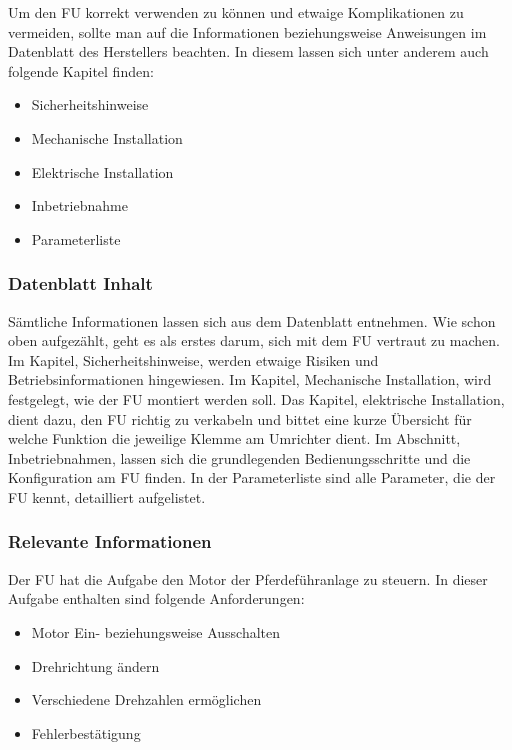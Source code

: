 Um den \ac{FU} korrekt verwenden zu können und etwaige Komplikationen zu vermeiden, sollte man auf die Informationen beziehungsweise Anweisungen im Datenblatt des Herstellers beachten. In diesem lassen sich unter anderem auch folgende Kapitel finden:

\begin{itemize}
	\item{Sicherheitshinweise}
	\item{Mechanische Installation}
	\item{Elektrische Installation}
	\item{Inbetriebnahme}
	\item{Parameterliste}
\end{itemize}

\subsubsection{Datenblatt Inhalt}
\label{sec:datenblattinhalt}

Sämtliche Informationen lassen sich aus dem Datenblatt entnehmen. Wie schon oben aufgezählt, geht es als erstes darum, sich mit dem \ac{FU} vertraut zu machen. Im  Kapitel, Sicherheitshinweise, werden etwaige Risiken und Betriebsinformationen hingewiesen. Im Kapitel, Mechanische Installation, wird festgelegt, wie der \ac{FU} montiert werden soll. Das Kapitel, elektrische Installation, dient dazu, den \ac{FU} richtig zu verkabeln und bittet eine kurze Übersicht für welche Funktion die jeweilige Klemme am Umrichter dient. Im Abschnitt, Inbetriebnahmen, lassen sich die grundlegenden Bedienungsschritte und die Konfiguration am \ac{FU} finden. In der Parameterliste sind alle Parameter, die der \ac{FU} kennt, detailliert aufgelistet.

\subsubsection{Relevante Informationen}
\label{sec:relevanteInformationen}

Der \ac{FU} hat die Aufgabe den Motor der Pferdeführanlage zu steuern. In dieser Aufgabe enthalten sind folgende Anforderungen:

\begin{itemize}
	\item{Motor Ein- beziehungsweise Ausschalten}
	\item{Drehrichtung ändern}
	\item{Verschiedene Drehzahlen ermöglichen}
	\item{Fehlerbestätigung}
\end{itemize}


